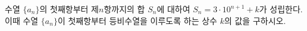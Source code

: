 수열 $\{a_n\}$의 첫째항부터 제$n$항까지의 합 $S_n$에 대하여 $S_n=3\cdot 10^{n+1}+k$가 성립한다. 이때 수열 $\{a_n\}$이 첫째항부터 등비수열을 이루도록 하는 상수 $k$의 값을 구하시오.
